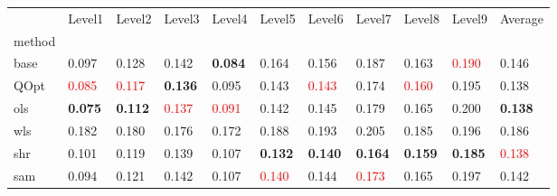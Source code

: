 \begin{tabular}{lllllllllll}
\toprule
 & Level1 & Level2 & Level3 & Level4 & Level5 & Level6 & Level7 & Level8 & Level9 & Average \\
method &  &  &  &  &  &  &  &  &  &  \\
\midrule
base & 0.097 & 0.128 & 0.142 & \textbf{0.084} & 0.164 & 0.156 & 0.187 & 0.163 & \textcolor{red}{0.190} & 0.146 \\
QOpt & \textcolor{red}{0.085} & \textcolor{red}{0.117} & \textbf{0.136} & 0.095 & 0.143 & \textcolor{red}{0.143} & 0.174 & \textcolor{red}{0.160} & 0.195 & 0.138 \\
ols & \textbf{0.075} & \textbf{0.112} & \textcolor{red}{0.137} & \textcolor{red}{0.091} & 0.142 & 0.145 & 0.179 & 0.165 & 0.200 & \textbf{0.138} \\
wls & 0.182 & 0.180 & 0.176 & 0.172 & 0.188 & 0.193 & 0.205 & 0.185 & 0.196 & 0.186 \\
shr & 0.101 & 0.119 & 0.139 & 0.107 & \textbf{0.132} & \textbf{0.140} & \textbf{0.164} & \textbf{0.159} & \textbf{0.185} & \textcolor{red}{0.138} \\
sam & 0.094 & 0.121 & 0.142 & 0.107 & \textcolor{red}{0.140} & 0.144 & \textcolor{red}{0.173} & 0.165 & 0.197 & 0.142 \\
\bottomrule
\end{tabular}
